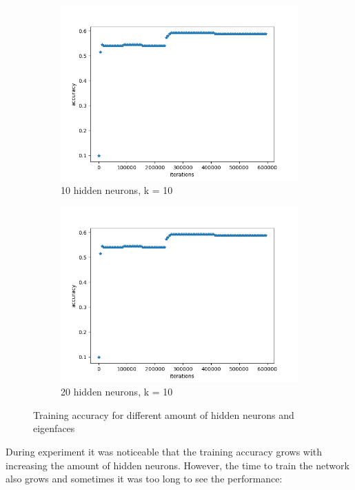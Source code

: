 \begin{figure}[H]
\begin{subfigure}[b]{.45\linewidth}
\includegraphics[width=\linewidth]{img/tests/lwf/40ppl/PCA_MLPk10h20}
\caption{10 hidden neurons, k = 10}
\end{subfigure}
\begin{subfigure}[b]{.45\linewidth}
\includegraphics[width=\linewidth]{img/tests/lwf/40ppl/PCA_MLPk10h20.png}
\caption{20 hidden neurons, k = 10}
\end{subfigure}
\caption{Training accuracy for different amount of hidden neurons and eigenfaces}
\end{figure}

During experiment it was noticeable that the training accuracy grows with increasing the amount of hidden neurons. However, the time to train the network also grows and sometimes it was too long to see the performance:

